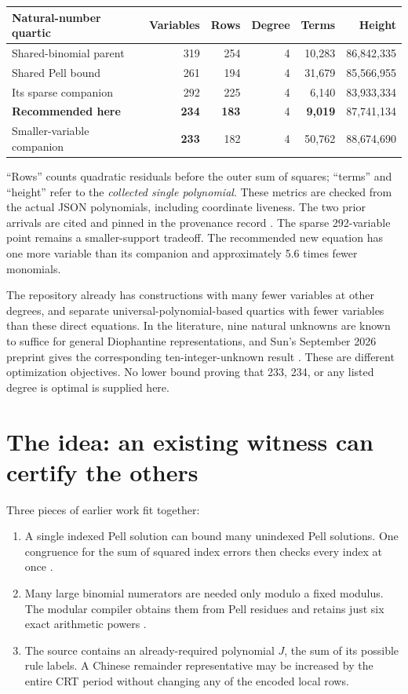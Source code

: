 \documentclass[11pt,a4paper]{article}
\theoremstyle{remark}
\begin{document}
\begin{center}\small
\begin{tabular}{lrrrrr}
\toprule
Natural-number quartic & Variables & Rows & Degree & Terms & Height\\
\midrule
Shared-binomial parent &319&254&4&10,283&86,842,335\\
Shared Pell bound &261&194&4&31,679&85,566,955\\
Its sparse companion &292&225&4&6,140&83,933,334\\
\textbf{Recommended here} &\textbf{234}&\textbf{183}&4&\textbf{9,019}&87,741,134\\
Smaller-variable companion &\textbf{233}&182&4&50,762&88,674,690\\
\bottomrule
\end{tabular}
\end{center}
``Rows'' counts quadratic residuals before the outer sum of squares; ``terms''
and ``height'' refer to the \emph{collected single polynomial}. These metrics
are checked from the actual JSON polynomials, including coordinate liveness.
The two prior arrivals are cited and pinned in the provenance record
\cite{sharedbinomial,cap261}. The sparse 292-variable point remains a
smaller-support tradeoff. The recommended new equation has one more variable
than its companion and approximately 5.6 times fewer monomials.

The repository already has constructions with many fewer variables at other
degrees, and separate universal-polynomial-based quartics with fewer variables
than these direct equations. In the literature, nine natural unknowns are
known to suffice for general Diophantine representations, and Sun's September
2026 preprint gives the corresponding ten-integer-unknown result
\cite{sun2026}. These are different optimization objectives. No lower bound
proving that 233, 234, or any listed degree is optimal is supplied here.

\section{The idea: an existing witness can certify the others}

Three pieces of earlier work fit together:
\begin{enumerate}[leftmargin=*]
\item A single indexed Pell solution can bound many unindexed Pell solutions.
One congruence for the sum of squared index errors then checks every index
at once \cite{cap261}.
\item Many large binomial numerators are needed only modulo a fixed modulus.
The modular compiler obtains them from Pell residues and retains just six
exact arithmetic powers \cite{sharedbinomial,residuecompiler}.
\item The source contains an already-required polynomial \(J\), the sum of its
possible rule labels. A Chinese remainder representative may be increased by
the entire CRT period without changing any of the encoded local rows.
\end{enumerate}
\end{document}

